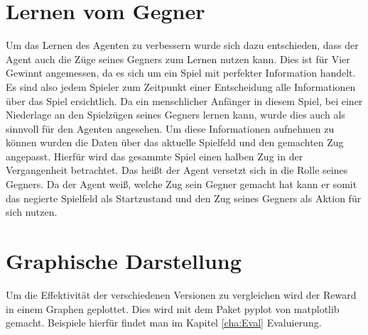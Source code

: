 \section{Lernen vom Gegner}
Um das Lernen des Agenten zu verbessern wurde sich dazu entschieden, dass der Agent auch die Züge seines Gegners zum Lernen nutzen kann. Dies ist für Vier Gewinnt angemessen, da es sich um ein Spiel mit perfekter Information handelt. Es sind also jedem Spieler zum Zeitpunkt einer Entscheidung alle Informationen über das Spiel ersichtlich. Da ein menschlicher Anfänger in diesem Spiel, bei einer Niederlage an den Spielzügen seines Gegners lernen kann, wurde dies auch als sinnvoll für den Agenten angesehen. Um diese Informationen aufnehmen zu können wurden die Daten über das aktuelle Spielfeld und den gemachten Zug angepasst. Hierfür wird das gesammte Spiel einen halben Zug in der Vergangenheit betrachtet. Das heißt der Agent versetzt sich in die Rolle seines Gegners. Da der Agent weiß, welche Zug sein Gegner gemacht hat kann er somit das negierte Spielfeld als Startzustand und den Zug seines Gegners als Aktion für sich nutzen. 

\section{Graphische Darstellung}
Um die Effektivität der verschiedenen Versionen zu vergleichen wird der Reward in einem Graphen geplottet. Dies wird mit dem Paket pyplot von matplotlib gemacht. Beispiele hierfür findet man im Kapitel \ref{cha:Eval}  Evaluierung. \\


